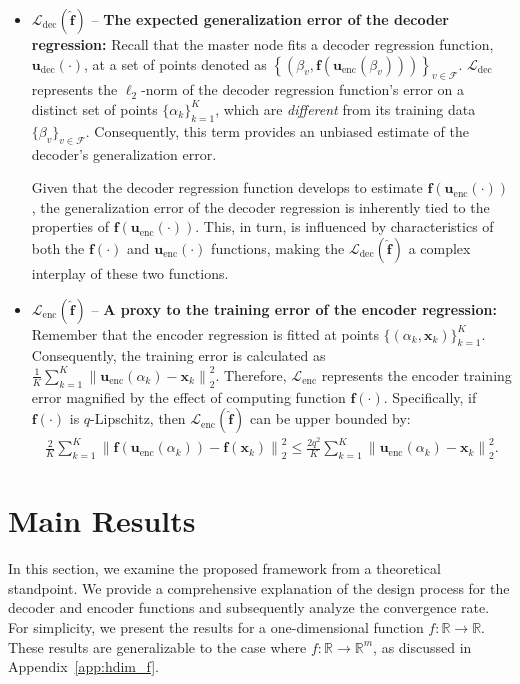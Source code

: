 \documentclass{article}
\def\enc{\mathbf{u}_\textrm{enc}}
\def\dec{\mathbf{u}_\textrm{dec}}
\def\lenc{\mathcal{L}_\textrm{enc}}
\def\ldec{\mathcal{L}_\textrm{dec}}
\def\func{\mathbf{f}}
\def\stset{\mathcal{F}}
\def\fhat{\mathbf{\hat{f}}}
\newcommand{\norm}[1]{\left\lVert#1\right\rVert}
\begin{document}
\begin{itemize}
    \item $\ldec(\fhat)$ -- \textbf{The expected generalization error of the decoder regression:} Recall that the master node fits a decoder regression function, $\dec(\cdot)$, at a set of points denoted as $\left\{(\beta_v, \func(\enc(\beta_v)))\right\}_{v \in \stset}$. $\ldec$ represents the $\ell_2$-norm of the decoder regression function's error on a distinct set of points $\{\alpha_k\}^K_{k=1}$, which are \emph{different} from its training data $\{ \beta_v\}_{v \in \stset}$. Consequently, this term provides an unbiased estimate of the decoder's generalization error. 

    Given that the decoder regression function develops to estimate $\func(\enc(\cdot))$, the generalization error of the decoder regression is inherently tied to the properties of $\func(\enc(\cdot))$. This, in turn, is influenced by characteristics of both the $\func(\cdot)$ and $\enc(\cdot)$ functions, making the $\ldec(\fhat)$ a complex interplay of these two functions.
    \item $\lenc(\fhat)$ -- \textbf{A proxy to the training error of the encoder regression:} Remember that the encoder regression is fitted at points $\{(\alpha_k, \mathbf{x}_k)\}^K_{k=1}$. Consequently, the training error is calculated as $\frac{1}{K} \sum^K_{k=1} \norm{\enc(\alpha_k) - \mathbf{x}_k}^2_2$. Therefore, $\lenc$ represents the encoder training error magnified by the effect of computing function $\func(\cdot)$. Specifically, if $\func(\cdot)$ is $q$-Lipschitz, then $\lenc(\fhat)$ can be upper bounded by:
    \begin{align}\label{eq:lipschitz_enc}
     \frac{2}{K} \sum^K_{k=1} \norm{\func(\enc(\alpha_k)) - \func(\mathbf{x}_k)}^2_2 \leqslant \frac{2q^2}{K} \sum^K_{k=1} \norm{\enc(\alpha_k) - \mathbf{x}_k}^2_2.
    \end{align}
\end{itemize}

\section{Main Results}\label{sec:mainreults}
In this section, we examine the proposed framework from a theoretical standpoint. We provide a comprehensive explanation of the design process for the decoder and encoder functions and subsequently analyze the convergence rate. For simplicity, we present the results for a one-dimensional function $f:\mathbb{R} \to \mathbb{R}$. These results are generalizable to the case where $f:\mathbb{R} \to \mathbb{R}^m$, as discussed in Appendix~\ref{app:hdim_f}.
\end{document}
